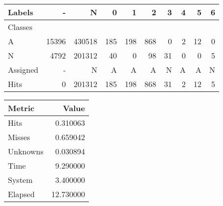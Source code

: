 \begin{tabular}{l|r|r|r|r|r|r|r|r|r}

Labels &      - &       N &    0 &    1 &    2 &   3 &  4 &   5 &  6 \\\hline
Classes  &        &         &      &      &      &     &    &     &    \\\hline
\hline
A        &  15396 &  430518 &  185 &  198 &  868 &   0 &  2 &  12 &  0 \\\hline
N        &   4792 &  201312 &   40 &    0 &   98 &  31 &  0 &   0 &  5 \\\hline
\hline
Assigned &      - &       N &    A &    A &    A &   N &  A &   A &  N \\\hline
Hits     &      0 &  201312 &  185 &  198 &  868 &  31 &  2 &  12 &  5 
\end{tabular}
\begin{tabular}{l|r}

Metric   &      Value \\\hline
\hline
Hits     &   0.310063 \\\hline
Misses   &   0.659042 \\\hline
Unknowns &   0.030894 \\\hline
Time     &   9.290000 \\\hline
System   &   3.400000 \\\hline
Elapsed  &  12.730000 
\end{tabular}
